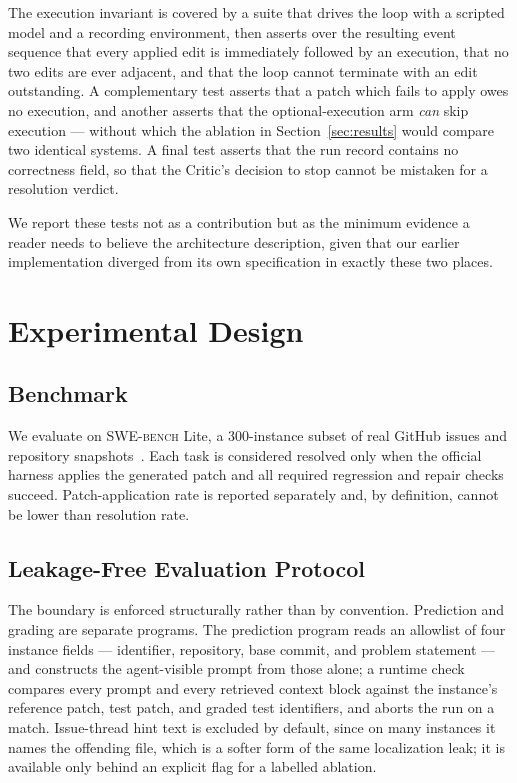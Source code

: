 \documentclass[journal]{IEEEtran}
\newcommand{\swebench}{\textsc{SWE-bench}}
\begin{document}
The execution invariant is covered by a suite that drives the loop with a scripted model and a recording environment, then asserts over the resulting event sequence that every applied edit is immediately followed by an execution, that no two edits are ever adjacent, and that the loop cannot terminate with an edit outstanding. A complementary test asserts that a patch which fails to apply owes no execution, and another asserts that the optional-execution arm \emph{can} skip execution — without which the ablation in Section~\ref{sec:results} would compare two identical systems. A final test asserts that the run record contains no correctness field, so that the Critic's decision to stop cannot be mistaken for a resolution verdict.

We report these tests not as a contribution but as the minimum evidence a reader needs to believe the architecture description, given that our earlier implementation diverged from its own specification in exactly these two places.

\section{Experimental Design}
\label{sec:experiments}

\subsection{Benchmark}

We evaluate on \swebench{} Lite, a 300-instance subset of real GitHub issues and repository snapshots~\cite{jimenez2024swebench}. Each task is considered resolved only when the official harness applies the generated patch and all required regression and repair checks succeed. Patch-application rate is reported separately and, by definition, cannot be lower than resolution rate.

\subsection{Leakage-Free Evaluation Protocol}

The boundary is enforced structurally rather than by convention. Prediction and grading are separate programs. The prediction program reads an allowlist of four instance fields — identifier, repository, base commit, and problem statement — and constructs the agent-visible prompt from those alone; a runtime check compares every prompt and every retrieved context block against the instance's reference patch, test patch, and graded test identifiers, and aborts the run on a match. Issue-thread hint text is excluded by default, since on many instances it names the offending file, which is a softer form of the same localization leak; it is available only behind an explicit flag for a labelled ablation.
\end{document}
